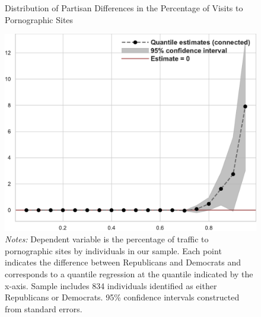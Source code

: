 \documentclass[12pt, letterpaper]{article}
\begin{document}
\begin{figure}
	\centering
	\caption{Distribution of Partisan Differences in the Percentage of Visits to Pornographic Sites}
	\includegraphics[width=.6\linewidth]{../figs/quantile_reg_proportion_visits_adult.pdf}
	\caption*{\footnotesize \emph{Notes:} 
		Dependent variable is the percentage of traffic to pornographic sites by individuals in our sample.
		Each point indicates the difference between Republicans and Democrats and corresponds to a quantile regression at the quantile indicated by the x-axis.
		Sample includes 834 individuals identified as either Republicans or Democrats.
		95\% confidence intervals constructed from standard errors.
	}
	\label{fig:quantile_regression_prop_visits}
\end{figure}
\end{document}
